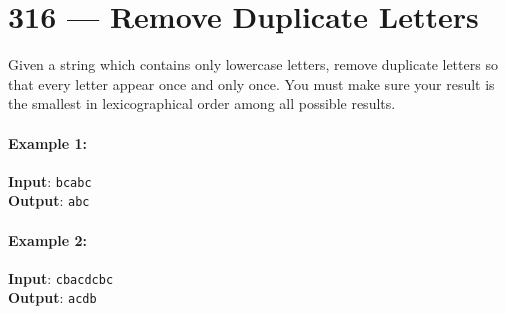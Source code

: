 \section{316 --- Remove Duplicate Letters}
Given a string which contains only lowercase letters, remove duplicate letters so that every letter appear once and only once. You must make sure your result is the smallest in lexicographical order among all possible results.

\paragraph{Example 1:}

\begin{flushleft}
\textbf{Input}: \texttt{bcabc}
\\
\textbf{Output}: \texttt{abc}
\end{flushleft}

\paragraph{Example 2:}

\begin{flushleft}
\textbf{Input}: \texttt{cbacdcbc}
\\
\textbf{Output}: \texttt{acdb}
\end{flushleft}
